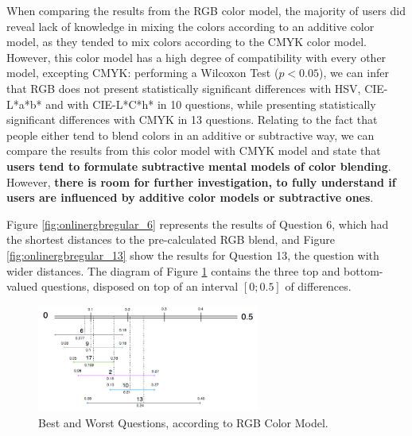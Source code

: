 %
When comparing the results from the RGB color model, the majority of users did reveal lack of knowledge in mixing the colors according to an additive color model, as they tended to mix colors according to the CMYK color model. However, this color
model has a high degree of compatibility with every other model, excepting CMYK: performing a Wilcoxon Test ($p < 0.05$), we can infer that RGB does not present statistically significant differences with HSV, CIE-L*a*b* and with CIE-L*C*h* in 10
questions, while presenting statistically significant differences with CMYK in 13 questions.
Relating to the fact that people either tend to blend colors in an additive or subtractive way, we can compare the results from this color model with CMYK model and state that \textbf{users tend to formulate subtractive mental models of color
blending}. However, \textbf{there is room for further investigation, to fully understand if users are influenced by additive color models or subtractive ones}. \par
%
Figure \ref{fig:onlinergbregular_6} represents the results of Question 6, which had the shortest distances to the pre-calculated RGB blend, and Figure \ref{fig:onlinergbregular_13} show the results for Question 13, the question with wider
distances. The diagram of Figure \ref{fig:rgb_analysis} contains the three top and bottom-valued questions, disposed on top of an interval $[0 ; 0.5]$ of differences. \par
%
\begin{figure}[!htbp]
  \centering
  \vspace{-15pt}
  \includegraphics[width=0.65\textwidth]{images/results/rgb_questions_analysis.png}
  \caption[Best and Worst Questions, according RGB Color Model.]{Best and Worst Questions, according to RGB Color Model.}
  \vspace{-5pt}
  \label{fig:rgb_analysis}
\end{figure}
%
%
